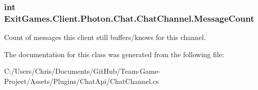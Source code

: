 \subsubsection[{\texorpdfstring{Message\+Count}{MessageCount}}]{\setlength{\rightskip}{0pt plus 5cm}int Exit\+Games.\+Client.\+Photon.\+Chat.\+Chat\+Channel.\+Message\+Count\hspace{0.3cm}{\ttfamily [get]}}\hypertarget{class_exit_games_1_1_client_1_1_photon_1_1_chat_1_1_chat_channel_a91a15ffc97cfd40eea6cf7965b99e5dc}{}\label{class_exit_games_1_1_client_1_1_photon_1_1_chat_1_1_chat_channel_a91a15ffc97cfd40eea6cf7965b99e5dc}


Count of messages this client still buffers/knows for this channel.



The documentation for this class was generated from the following file\+:\begin{DoxyCompactItemize}
\item 
C\+:/\+Users/\+Chris/\+Documents/\+Git\+Hub/\+Team-\/\+Game-\/\+Project/\+Assets/\+Plugins/\+Chat\+Api/Chat\+Channel.\+cs\end{DoxyCompactItemize}
